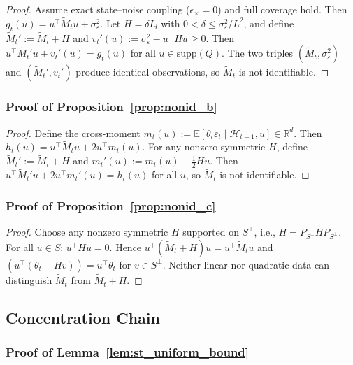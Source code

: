 \documentclass{article}
\newcommand{\R}{\mathbb{R}}
\newcommand{\E}{\mathbb{E}}
\newcommand{\cH}{\mathcal{H}}
\newcommand{\supp}{\mathrm{supp}}
\begin{document}
\begin{proof}
Assume exact state--noise coupling ($\epsilon_\times = 0$) and full coverage hold. Then $g_t(u) = u^\top \widetilde{M}_t u + \sigma_\varepsilon^2$.
Let $H = \delta I_d$ with $0 < \delta \le \sigma_\varepsilon^2/L^2$, and define $\widetilde{M}_t' := \widetilde{M}_t + H$ and $v_t'(u) := \sigma_\varepsilon^2 - u^\top H u \ge 0$.
Then $u^\top \widetilde{M}_t' u + v_t'(u) = g_t(u)$ for all $u \in \supp(Q)$.
The two triples $(\widetilde{M}_t, \sigma_\varepsilon^2)$ and $(\widetilde{M}_t', v_t')$ produce identical observations, so $\widetilde{M}_t$ is not identifiable.
\end{proof}

\subsubsection{Proof of Proposition~\ref{prop:nonid_b}}
\label{proof:nonid_b}

\begin{proof}
Define the cross-moment $m_t(u) := \E[\theta_t \varepsilon_t \mid \cH_{t-1}, u] \in \R^d$.
Then $h_t(u) = u^\top \widetilde{M}_t u + 2u^\top m_t(u)$.
For any nonzero symmetric $H$, define $\widetilde{M}_t' := \widetilde{M}_t + H$ and $m_t'(u) := m_t(u) - \tfrac{1}{2}Hu$.
Then $u^\top \widetilde{M}_t' u + 2u^\top m_t'(u) = h_t(u)$ for all $u$, so $\widetilde{M}_t$ is not identifiable.
\end{proof}

\subsubsection{Proof of Proposition~\ref{prop:nonid_c}}
\label{proof:nonid_c}

\begin{proof}
Choose any nonzero symmetric $H$ supported on $S^\perp$, i.e., $H = P_{S^\perp} H P_{S^\perp}$.
For all $u \in S$: $u^\top H u = 0$.
Hence $u^\top(\widetilde{M}_t + H)u = u^\top \widetilde{M}_t u$ and $(u^\top(\theta_t + Hv)) = u^\top \theta_t$ for $v \in S^\perp$.
Neither linear nor quadratic data can distinguish $\widetilde{M}_t$ from $\widetilde{M}_t + H$.
\end{proof}

\subsection{Concentration Chain}

\subsubsection{Proof of Lemma~\ref{lem:st_uniform_bound}}
\label{proof:st_uniform_bound}
\end{document}
